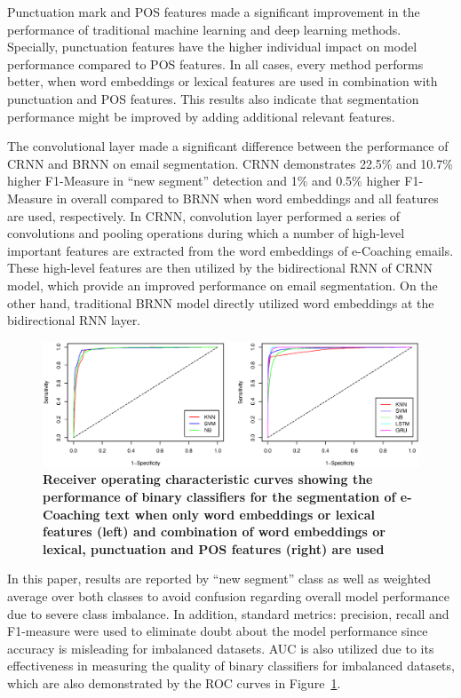 \documentclass{amia}
\begin{document}
Punctuation mark and POS features made a significant improvement in the performance of traditional machine learning and deep learning methods. Specially, punctuation features have the higher individual impact on model performance compared to POS features. In all cases, every method performs better, when word embeddings or lexical features are used in combination with punctuation and POS features. This results also indicate that segmentation performance might be improved by adding additional relevant features. 

The convolutional layer made a significant difference between the performance of CRNN and BRNN on email segmentation. CRNN demonstrates 22.5\% and 10.7\% higher F1-Measure in ``new segment'' detection and 1\% and 0.5\% higher F1-Measure in overall compared to BRNN when word embeddings and all features are used, respectively. In CRNN, convolution layer performed a series of convolutions and pooling operations during which a number of high-level important features are extracted from the word embeddings of e-Coaching emails. These high-level features are then utilized by the bidirectional RNN of CRNN model, which provide an improved performance on email segmentation. On the other hand, traditional BRNN model directly utilized word embeddings at the bidirectional RNN layer.   

\begin{figure}[!htb]
    \centering
    \includegraphics[width=1.0\textwidth]{figures/roc-curves.eps}
    \caption{\textbf{Receiver operating characteristic curves showing the performance of binary classifiers for the segmentation of e-Coaching text when only word embeddings or lexical features (left) and combination of word embeddings or lexical, punctuation and POS features (right) are used}}
    \label{fig:roc-curves}
\end{figure}

In this paper, results are reported by ``new segment'' class as well as weighted average over both classes to avoid confusion regarding overall model performance due to severe class imbalance. In addition, standard metrics: precision, recall and F1-measure were used to eliminate doubt about the model performance since accuracy is misleading for imbalanced datasets. AUC is also utilized due to its effectiveness in measuring the quality of binary classifiers for imbalanced datasets,\cite{hu2015kernelized} which are also demonstrated by the ROC curves in Figure~\ref{fig:roc-curves}. 
\end{document}
